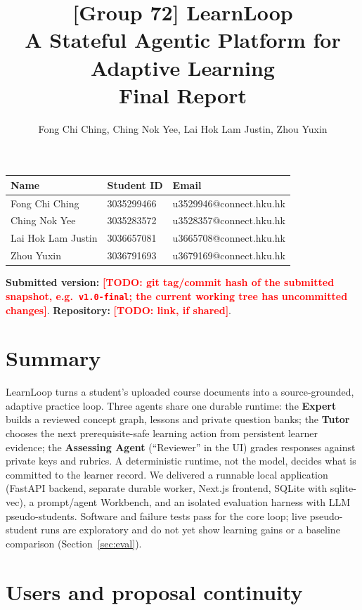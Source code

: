 \documentclass{article}
\title{[Group 72] LearnLoop\\A Stateful Agentic Platform for Adaptive Learning\\Final Report}
\author{Fong Chi Ching, Ching Nok Yee, Lai Hok Lam Justin, Zhou Yuxin}
\newcommand{\todo}[1]{\textcolor{red}{\textbf{[TODO: #1]}}}
\newcommand{\code}[1]{\texttt{\small #1}}
\begin{document}
\maketitle

\begin{tabular}{@{}lll@{}}
\toprule
\textbf{Name} & \textbf{Student ID} & \textbf{Email} \\
\midrule
Fong Chi Ching & 3035299466 & u3529946@connect.hku.hk \\
Ching Nok Yee & 3035283572 & u3528357@connect.hku.hk \\
Lai Hok Lam Justin & 3036657081 & u3665708@connect.hku.hk \\
Zhou Yuxin & 3036791693 & u3679169@connect.hku.hk \\
\bottomrule
\end{tabular}

\vspace{4pt}
\noindent\textbf{Submitted version:} \todo{git tag/commit hash of the submitted snapshot, e.g.\ \code{v1.0-final}; the current working tree has uncommitted changes}.
\textbf{Repository:} \todo{link, if shared}.

\section{Summary}

LearnLoop turns a student's uploaded course documents into a source-grounded, adaptive practice loop. Three agents share one durable runtime: the \textbf{Expert} builds a reviewed concept graph, lessons and private question banks; the \textbf{Tutor} chooses the next prerequisite-safe learning action from persistent learner evidence; the \textbf{Assessing Agent} (``Reviewer'' in the UI) grades responses against private keys and rubrics. A deterministic runtime, not the model, decides what is committed to the learner record. We delivered a runnable local application (FastAPI backend, separate durable worker, Next.js frontend, SQLite with sqlite-vec), a prompt/agent Workbench, and an isolated evaluation harness with LLM pseudo-students. Software and failure tests pass for the core loop; live pseudo-student runs are exploratory and do not yet show learning gains or a baseline comparison (Section~\ref{sec:eval}).

\section{Users and proposal continuity}
\end{document}
